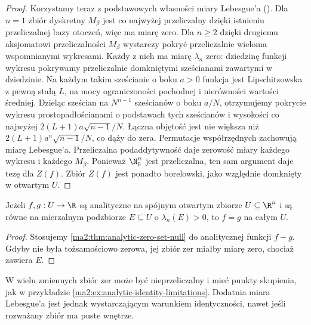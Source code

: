 \begin{proof}
Korzystamy teraz z podstawowych własności
miary Lebesgue'a
().
Dla $n=1$ zbiór dyskretny $M_\beta$ jest
co najwyżej przeliczalny dzięki istnieniu
przeliczalnej bazy otoczeń, więc ma miarę zero.
Dla $n\ge2$ dzięki drugiemu aksjomatowi
przeliczalności $M_\beta$ wystarczy pokryć
przeliczalnie wieloma wspomnianymi wykresami.
Każdy z nich ma miarę $\lambda_n$ zero:
dziedzinę funkcji wykresu pokrywamy przeliczalnie
domkniętymi sześcianami zawartymi w dziedzinie.
Na każdym takim sześcianie o boku $a>0$
funkcja jest Lipschitzowska z pewną stałą $L$,
na mocy ograniczoności pochodnej i nierówności
wartości średniej.
Dzieląc sześcian na $N^{n-1}$ sześcianów
o boku $a/N$, otrzymujemy pokrycie wykresu
prostopadłościanami o podstawach tych sześcianów
i wysokości co najwyżej
$2(L+1)a\sqrt{n-1}/N$.
Łączna objętość jest nie większa niż
$2(L+1)a^n\sqrt{n-1}/N$, co dąży do zera.
Permutacje współrzędnych zachowują miarę
Lebesgue'a. Przeliczalna podaddytywność
daje zerowość miary każdego wykresu
i każdego $M_\beta$.
Ponieważ $\N_0^n$ jest przeliczalna,
ten sam argument daje tezę dla $Z(f)$.
Zbiór $Z(f)$ jest ponadto borelowski,
jako względnie domknięty w otwartym $U$.
\end{proof}

\begin{wniosek}
\label{ma2:cor:analytic-identity-positive-measure}
Jeżeli $f,g:U\to\R$ są analityczne na spójnym
otwartym zbiorze $U\subseteq\R^n$ i są równe
na mierzalnym podzbiorze $E\subseteq U$
o $\lambda_n(E)>0$, to $f=g$ na całym $U$.
\end{wniosek}
\begin{proof}
Stosujemy \ref{ma2:thm:analytic-zero-set-null}
do analitycznej funkcji $f-g$.
Gdyby nie była tożsamościowo zerowa,
jej zbiór zer miałby miarę zero, chociaż
zawiera $E$.
\end{proof}

W wielu zmiennych zbiór zer może być
nieprzeliczalny i mieć punkty skupienia,
jak w przykładzie
\ref{ma2:ex:analytic-identity-limitations}.
Dodatnia miara Lebesgue'a jest jednak
wystarczającym warunkiem identyczności,
nawet jeśli rozważany zbiór ma puste wnętrze.
